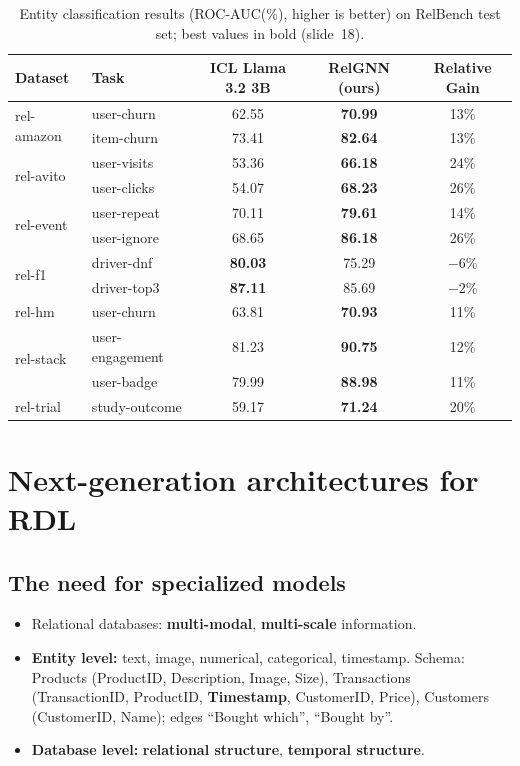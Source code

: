 \begin{table}[htbp]
  \centering\small
  \caption{Entity classification results (ROC-AUC(\%), higher is better) on RelBench test
  set; best values in bold (slide~18).}
  \label{tab:lec13-llm}
  \begin{tabular}{@{}llccc@{}}
    \toprule
    Dataset & Task & ICL Llama 3.2 3B & RelGNN (ours) & Relative Gain\\
    \midrule
    \multirow{2}{*}{rel-amazon} & user-churn & 62.55 & \textbf{70.99} & 13\%\\
      & item-churn & 73.41 & \textbf{82.64} & 13\%\\
    \multirow{2}{*}{rel-avito} & user-visits & 53.36 & \textbf{66.18} & 24\%\\
      & user-clicks & 54.07 & \textbf{68.23} & 26\%\\
    \multirow{2}{*}{rel-event} & user-repeat & 70.11 & \textbf{79.61} & 14\%\\
      & user-ignore & 68.65 & \textbf{86.18} & 26\%\\
    \multirow{2}{*}{rel-f1} & driver-dnf & \textbf{80.03} & 75.29 & $-6$\%\\
      & driver-top3 & \textbf{87.11} & 85.69 & $-2$\%\\
    rel-hm & user-churn & 63.81 & \textbf{70.93} & 11\%\\
    \multirow{2}{*}{rel-stack} & user-engagement & 81.23 & \textbf{90.75} & 12\%\\
      & user-badge & 79.99 & \textbf{88.98} & 11\%\\
    rel-trial & study-outcome & 59.17 & \textbf{71.24} & 20\%\\
    \bottomrule
  \end{tabular}
\end{table}

\section{Next-generation architectures for RDL}\label{sec:lec13-nextgen}

\subsection{The need for specialized models}\label{sec:lec13-need}

\begin{itemize}
  \item Relational databases: \textbf{multi-modal}, \textbf{multi-scale} information.
  \item \textbf{Entity level:} text, image, numerical, categorical, timestamp. Schema:
    Products (ProductID, Description, Image, Size), Transactions (TransactionID,
    ProductID, \textbf{Timestamp}, CustomerID, Price), Customers (CustomerID, Name);
    edges ``Bought which'', ``Bought by''.
  \item \textbf{Database level:} \textbf{relational structure}, \textbf{temporal
    structure}.
\end{itemize}

